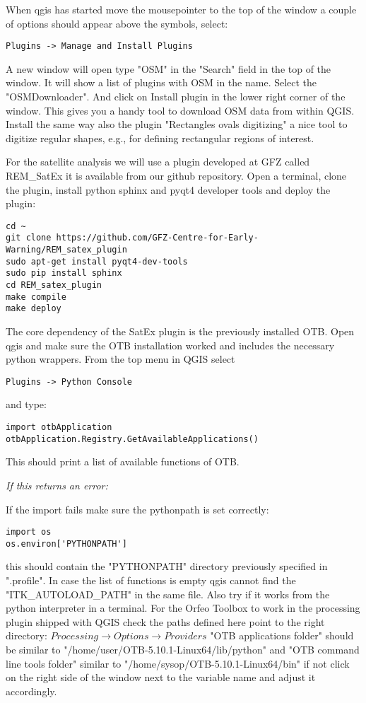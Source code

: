 \documentclass{article}
\begin{document}
When qgis has started move the mousepointer to the top of the window
a couple of options should appear above the symbols, select:
\begin{verbatim}
Plugins -> Manage and Install Plugins
\end{verbatim}
A new window will open type "OSM" in the "Search" field in the top 
of the window. It will show a list of plugins with OSM in the name.
Select the "OSMDownloader". And click on Install plugin 
in the lower right corner of the window. 
This gives you a handy tool to download
OSM data from within QGIS. Install the same way
also the plugin "Rectangles ovals digitizing" a nice tool to digitize
regular shapes, e.g., for defining rectangular regions of interest.

For the satellite analysis we will use a plugin developed at GFZ
called REM\_SatEx it is available from our github repository.
Open a terminal, clone the plugin, install python sphinx and
pyqt4 developer tools and deploy the plugin:
\begin{verbatim}
cd ~
git clone https://github.com/GFZ-Centre-for-Early-Warning/REM_satex_plugin
sudo apt-get install pyqt4-dev-tools
sudo pip install sphinx
cd REM_satex_plugin
make compile
make deploy
\end{verbatim}

The core dependency of the SatEx plugin is the previously installed 
OTB.
Open qgis and make sure the OTB installation worked 
and includes the necessary python wrappers. From
the top menu in QGIS select
\begin{verbatim}
Plugins -> Python Console
\end{verbatim}
and type:
\begin{verbatim}
import otbApplication
otbApplication.Registry.GetAvailableApplications()
\end{verbatim}
This should print a list of available functions of OTB. 

\textit{If this returns an error:}

If the import fails make sure the pythonpath is set correctly:
\begin{verbatim}
import os
os.environ['PYTHONPATH']
\end{verbatim}
this should contain the "PYTHONPATH" directory previously 
specified in ".profile".
In case the list of functions is empty qgis cannot find the
"ITK\_AUTOLOAD\_PATH" in the same file. Also try if
it works from the python interpreter in a terminal. 
For the Orfeo Toolbox to work in the processing plugin shipped with QGIS
check the paths defined here point to the right directory:
$Processing \rightarrow Options \rightarrow Providers$
"OTB applications folder" should be similar to "/home/user/OTB-5.10.1-Linux64/lib/python" and "OTB command line tools folder" similar to "/home/sysop/OTB-5.10.1-Linux64/bin" if not click on the right side of the window next to the variable name and adjust it accordingly.
\end{document}
